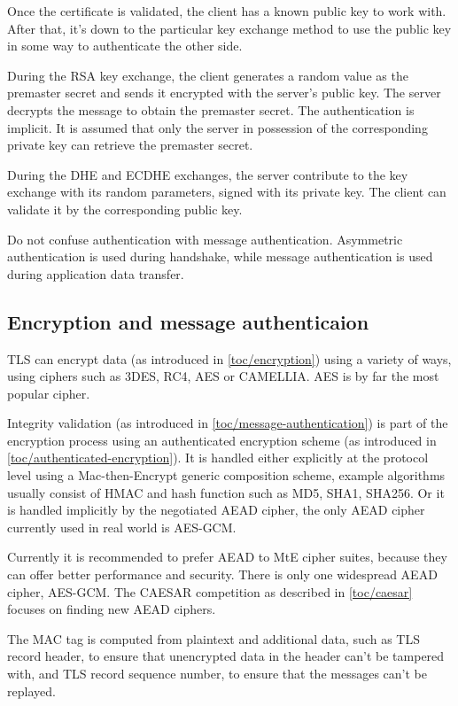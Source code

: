 Once the certificate is validated, the client has a known public key to work with. After that, it's down to the particular key exchange method to use the public key in some way to authenticate the other side.

During the RSA key exchange, the client generates a random value as the premaster secret and sends it encrypted with the server's public key. The server decrypts the message to obtain the premaster secret. The authentication is implicit. It is assumed that only the server in possession of the corresponding private key can retrieve the premaster secret.

During the DHE and ECDHE exchanges, the server contribute to the key exchange with its random parameters, signed with its private key. The client can validate it by the corresponding public key.

Do not confuse authentication with message authentication. Asymmetric authentication is used during handshake, while message authentication is used during application data transfer.

\subsection{Encryption and message authenticaion}

TLS can encrypt data (as introduced in \autoref{toc/encryption}) using a variety of ways, using ciphers such as 3DES, RC4, AES or CAMELLIA. AES is by far the most popular cipher.

Integrity validation (as introduced in \autoref{toc/message-authentication}) is part of the encryption process using an authenticated encryption scheme (as introduced in \autoref{toc/authenticated-encryption}). It is handled either explicitly at the protocol level using a Mac-then-Encrypt generic composition scheme, example algorithms usually consist of HMAC and hash function such as MD5, SHA1, SHA256. Or it is handled implicitly by the negotiated AEAD cipher, the only AEAD cipher currently used in real world is AES-GCM.

Currently it is recommended to prefer AEAD to MtE cipher suites, because they can offer better performance and security. There is only one widespread AEAD cipher, AES-GCM. The CAESAR competition as described in \autoref{toc/caesar} focuses on finding new AEAD ciphers.

The MAC tag is computed from plaintext and additional data, such as TLS record header, to ensure that unencrypted data in the header can't be tampered with, and TLS record sequence number, to ensure that the messages can't be replayed.

